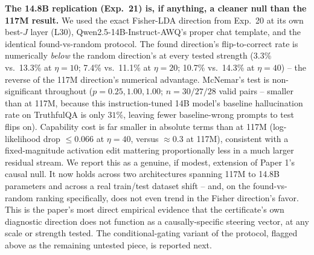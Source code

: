 \documentclass[onecolumn]{jmlr}
\begin{document}
\textbf{The 14.8B replication (Exp.~21) is, if anything, a cleaner
null than the 117M result.} We used the exact Fisher-LDA direction
from Exp.~20 at its own best-$J$ layer (L30), Qwen2.5-14B-Instruct-AWQ's
proper chat template, and the identical found-vs-random protocol. The
found direction's flip-to-correct rate is numerically \emph{below} the
random direction's at every tested strength (3.3\% vs.\ 13.3\% at
$\eta=10$; 7.4\% vs.\ 11.1\% at $\eta=20$; 10.7\% vs.\ 14.3\% at
$\eta=40$) -- the reverse of the 117M direction's numerical advantage.
McNemar's test is non-significant throughout ($p=0.25,1.00,1.00$;
$n=30/27/28$ valid pairs -- smaller than at 117M, because this
instruction-tuned 14B model's baseline hallucination rate on
TruthfulQA is only $31\%$, leaving fewer baseline-wrong prompts to
test flips on). Capability cost is far smaller in absolute terms than
at 117M (log-likelihood drop $\leq 0.066$ at $\eta=40$, versus
$\approx 0.3$ at 117M), consistent with a fixed-magnitude activation
edit mattering proportionally less in a much larger residual stream.
We report this as a genuine, if modest, extension of Paper 1's causal
null. It now holds across two architectures spanning 117M to 14.8B
parameters and across a real train/test dataset shift -- and, on the
found-vs-random ranking specifically, does not even trend in the
Fisher direction's favor. This is the paper's most direct empirical
evidence that the certificate's own diagnostic direction does not
function as a causally-specific steering vector, at any scale or
strength tested. The conditional-gating variant of the protocol,
flagged above as the remaining untested piece, is reported next.
\end{document}
